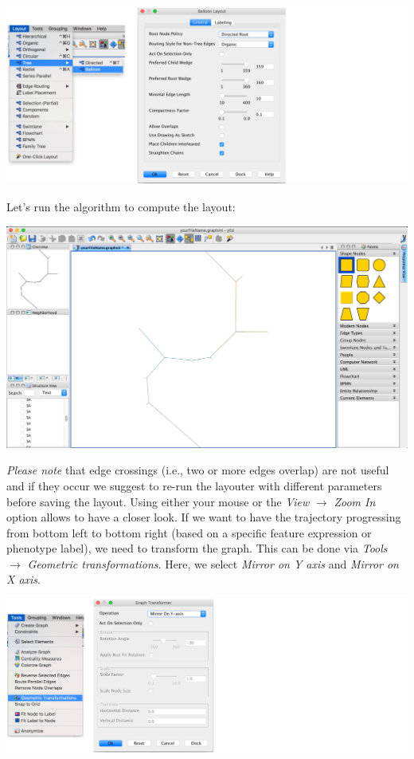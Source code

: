 \documentclass[]{book}
\theoremstyle{definition}
\theoremstyle{definition}
\theoremstyle{definition}
\theoremstyle{remark}
\begin{document}
\includegraphics[width=35.56in]{img/yEd_2-3}

Let's run the algorithm to compute the layout:

\includegraphics[width=35.56in]{img/yEd_4}

\emph{Please note} that edge crossings (i.e., two or more edges overlap)
are not useful and if they occur we suggest to re-run the layouter with
different parameters before saving the layout. Using either your mouse
or the \emph{View} \(\rightarrow\) \emph{Zoom In} option allows to have
a closer look. If we want to have the trajectory progressing from bottom
left to bottom right (based on a specific feature expression or
phenotype label), we need to transform the graph. This can be done via
\emph{Tools} \(\rightarrow\) \emph{Geometric transformations}. Here, we
select \emph{Mirror on Y axis} and \emph{Mirror on X axis}.

\includegraphics[width=35.56in]{img/yEd_5-6}
\end{document}
